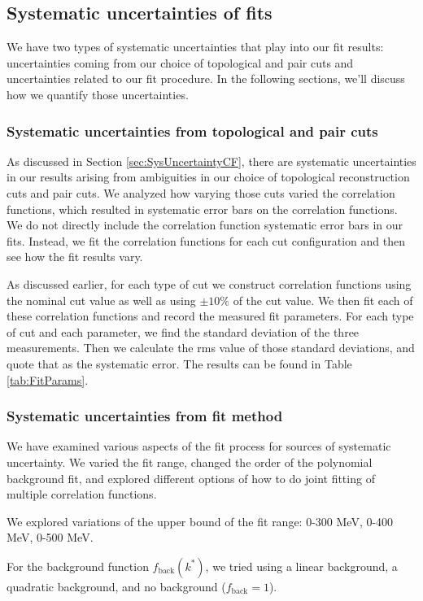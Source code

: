 \subsection{Systematic uncertainties of fits}
\label{sec:SysErrorsFits}

We have two types of systematic uncertainties that play into our fit results: uncertainties coming from our choice of topological and pair cuts and uncertainties related to our fit procedure.
In the following sections, we'll discuss how we quantify those uncertainties.


\subsubsection{Systematic uncertainties from topological and pair cuts}
\label{sec:SysErrorsFitsCuts}

As discussed in Section \ref{sec:SysUncertaintyCF}, there are systematic uncertainties in our results arising from ambiguities in our choice of topological reconstruction cuts and pair cuts.
We analyzed how varying those cuts varied the correlation functions, which resulted in systematic error bars on the correlation functions.
We do not directly include the correlation function systematic error bars in our fits.
Instead, we fit the correlation functions for each cut configuration and then see how the fit results vary.

As discussed earlier, for each type of cut we construct correlation functions using the nominal cut value as well as using $\pm10\%$ of the cut value.
We then fit each of these correlation functions and record the measured fit parameters.
For each type of cut and each parameter, we find the standard deviation of the three measurements.
Then we calculate the rms value of those standard deviations, and quote that as the systematic error.
The results can be found in Table \ref{tab:FitParams}.



\subsubsection{Systematic uncertainties from fit method}
\label{sec:SysErrorsFitsMethod}



We have examined various aspects of the fit process for sources of systematic uncertainty.
We varied the fit range, changed the order of the polynomial background fit, and explored different options of how to do joint fitting of multiple correlation functions.


We explored variations of the upper bound of the fit range: 0-300 MeV, 0-400 MeV, 0-500 MeV.

For the background function $f_{\mathrm{back}}(k^*)$, we tried using a linear background, a quadratic background, and no background ($f_\mathrm{back} = 1$).



